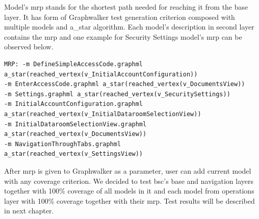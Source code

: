 \par
Model's \acrshort{mrp} stands for the shortest path needed for reaching it from the base layer. It has form of Graphwalker test generation criterion composed with multiple models and a\_star algorithm. Each model's description in second layer contains the \acrshort{mrp} and one example for Security Settings model's \acrshort{mrp} can be observed below.

\begin{lstlisting}
MRP: -m DefineSimpleAccessCode.graphml 
a_star(reached_vertex(v_InitialAccountConfiguration))
-m EnterAccessCode.graphml a_star(reached_vertex(v_DocumentsView))
-m Settings.graphml a_star(reached_vertex(v_SecuritySettings))
-m InitialAccountConfiguration.graphml 
a_star(reached_vertex(v_InitialDataroomSelectionView))
-m InitialDataroomSelectionView.graphml a_star(reached_vertex(v_DocumentsView)) 
-m NavigationThroughTabs.graphml a_star(reached_vertex(v_SettingsView))
\end{lstlisting}

After \acrshort{mrp} is given to Graphwalker as a parameter, user can add current model with any coverage criterion. We decided to test \acrshort{bsc}'s base and navigation layers together with 100\% coverage of all models in it and each model from operations layer with 100\% coverage together with their \acrshort{mrp}. Test results will be described in next chapter.

